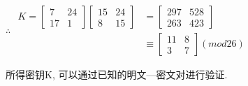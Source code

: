 \documentclass[UTF8]{ctexart}
\begin{document}
\begin{itemize}
\begin{enumerate}
\begin{itemize}
                $\therefore$
                $
                \begin{aligned}
                    K=\left[ \begin{array}{cc}{7} &{24}\\ {17} &{1} \end{array}\right]\left[ \begin{array}{cc}{15} &{24}\\ {8} &{15} \end{array}\right]
                            &=\left[ \begin{array}{cc}{297} &{528}\\ {263} &{423} \end{array}\right]\\
                                &\equiv \left[ \begin{array}{cc}{11} &{8}\\ {3} &{7} \end{array}\right](mod 26)
                \end{aligned}
                $

                所得密钥K, 可以通过已知的明文---密文对进行验证.
            \end{itemize}
        \end{enumerate}
    \end{itemize}
\end{document}
